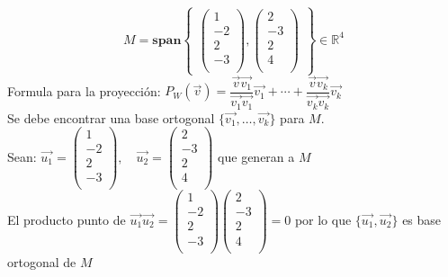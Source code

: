\documentclass[12pt,a4paper]{report}
\begin{document}
\begin{enumerate}
\begin{enumerate}
\begin{equation*}
M=\textbf{span}\begin{Bmatrix}
\begin{pmatrix}
1\\
-2\\
2\\
-3\\
\end{pmatrix},
\begin{pmatrix}
2\\
-3\\
2\\
4\\
\end{pmatrix}
\end{Bmatrix}
\in \mathbb{R}^{4}
\end{equation*}
Formula para la proyección: $P_{W}(\vec{v})=\dfrac{\vec{v}\vec{v_{1}}}{\vec{v_{1}}\vec{v_{1}}}\vec{v_{1}}+\cdots +\dfrac{\vec{v}\vec{v_{k}}}{\vec{v_{k}}\vec{v_{k}}}\vec{v_{k}}$\\

Se debe encontrar una base ortogonal $\lbrace\vec{v_{1}},\ldots,\vec{v_{k}}\rbrace$ para $M$.\\

Sean: $\vec{u_{1}}=\begin{pmatrix}
1\\
-2\\
2\\
-3\\
\end{pmatrix},\quad
\vec{u_{2}}=\begin{pmatrix}
2\\
-3\\
2\\
4\\
\end{pmatrix}$ que generan a $M$\\

El producto punto de $\vec{u_{1}}\vec{u_{2}}=\begin{pmatrix}
1\\
-2\\
2\\
-3\\
\end{pmatrix}
\begin{pmatrix}
2\\
-3\\
2\\
4\\
\end{pmatrix}=0$ por lo que $\lbrace \vec{u_{1}},\vec{u_{2}}\rbrace$ es base ortogonal de $M$\\


\end{enumerate}
\end{enumerate}
\end{document}
